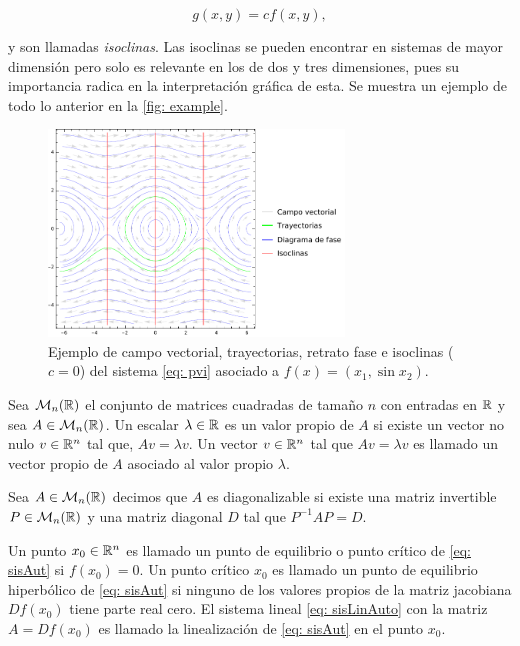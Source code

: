 \begin{equation}
	g(x, y) = cf(x, y),
	\label{eq: pendiente}
\end{equation}

y son llamadas \textit{isoclinas}. Las isoclinas se pueden encontrar en sistemas de mayor dimensión pero solo es relevante en los de dos y tres dimensiones, pues su importancia radica en la interpretación gráfica de esta. Se muestra un ejemplo de todo lo anterior en la \autoref{fig: example}.

\begin{figure}
	\centering
	\includegraphics[width=0.7\textwidth]{img/Example.pdf}
	\caption{Ejemplo de campo vectorial, trayectorias, retrato fase e isoclinas ($c=0$) del sistema \eqref{eq: pvi} asociado a $f(x)=(x_{1},\sin{x_{2}})$.}
	\label{fig: example}
\end{figure}

\begin{defi}
	Sea $\mathcal{M}_{n}({\mathbb{R}})$ el conjunto de matrices cuadradas de tamaño $n$ con entradas en ${\mathbb{R}}$ y sea $A \in \mathcal{M}_{n}({\mathbb{R}})$. Un escalar $\lambda \in {\mathbb{R}}$ es un valor propio de $A$ si existe un vector no nulo $v \in {\mathbb{R}}^{n}$ tal que, $Av = \lambda v$. Un vector $v \in {\mathbb{R}}^{n}$ tal que $Av = \lambda v$ es llamado un vector propio de $A$ asociado al valor propio $\lambda$.
\end{defi}

\begin{defi}
	Sea $A \in \mathcal{M}_{n}({\mathbb{R}})$ decimos que $A$ es diagonalizable si existe una matriz invertible $P \in \mathcal{M}_{n}({\mathbb{R}})$ y una matriz diagonal $D$ tal que $P^{-1}AP = D$.
\end{defi}

\begin{defi}
	Un punto $x_{0} \in {\mathbb{R}}^{n}$ es llamado un punto de equilibrio o punto crítico de \eqref{eq: sisAut} si $f(x_{0})=0$. Un punto crítico $x_{0}$ es llamado un punto de equilibrio hiperbólico de \eqref{eq: sisAut} si ninguno de los valores propios de la matriz jacobiana $Df(x_{0})$ tiene parte real cero. El sistema lineal \eqref{eq: sisLinAuto} con la matriz $A = Df(x_{0})$ es llamado la linealización de \eqref{eq: sisAut} en el punto $x_{0}$.
\end{defi}

